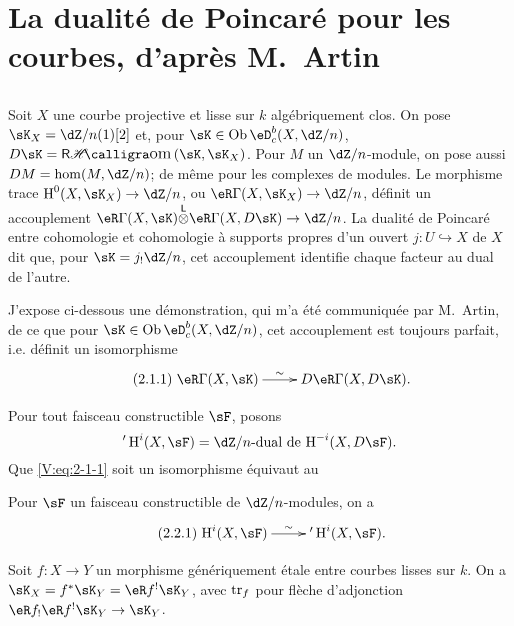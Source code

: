 \section{La dualité de Poincaré pour les courbes, d'après M.\ Artin}\label{V:2}





\subsection{}\label{V:2-1}

Soit $X$ une courbe projective et lisse sur $k$ algébriquement clos. On pose 
$\sK_X=\dZ/n(1)[2]$ et, pour $\sK\in\ob \eD_c^b(X,\dZ/n)$, 
$D\sK=\rHom(\sK,\sK_X)$. Pour $M$ un $\dZ/n$-module, on pose aussi 
$D M = \hom(M,\dZ/n)$; de même pour les complexes de modules. Le morphisme 
trace $\h^0(X,\sK_X) \to \dZ/n$, ou $\eR\Gamma(X,\sK_X)\to \dZ/n$, définit un 
accouplement $\eR\Gamma(X,\sK)\lotimes\eR\Gamma(X,D\sK) \to \dZ/n$. La dualité 
de Poincaré entre cohomologie et cohomologie à supports propres d'un ouvert 
$j:U\hookrightarrow X$ de $X$ dit que, pour $\sK=j_!\dZ/n$, cet accouplement 
identifie chaque facteur au dual de l'autre. 

J'expose ci-dessous une démonstration, qui m'a été communiquée par 
M.\ Artin, de ce que pour $\sK\in\ob\eD_c^b(X,\dZ/n)$, cet accouplement est 
toujours parfait, i.e. définit un isomorphisme
\begin{equation*}\tag{2.1.1}\label{V:eq:2-1-1}
\xymatrix{
  \eR\Gamma(X,\sK) \ar[r]^-\sim 
    & D \eR\Gamma(X,D\sK) \text{.}
}
\end{equation*}

Pour tout faisceau constructible $\sF$, posons 
\[
  '\h^i(X,\sF) = \text{$\dZ/n$-dual de $\h^{-i}(X,D\sF)$.}
\]
Que \eqref{V:eq:2-1-1} soit un isomorphisme équivaut au 





\begin{theorem_}\label{V:2-2}
Pour $\sF$ un faisceau constructible de $\dZ/n$-modules, on a 
\begin{equation*}\tag{2.2.1}\label{V:eq:2-2-1}
\xymatrix{
  \h^i(X,\sF) \ar[r]^-\sim 
    & '\h^i(X,\sF) \text{.}
}
\end{equation*}
\end{theorem_}





\begin{lemma_}\label{V:2-3}
Soit $f:X\to Y$ un morphisme génériquement étale entre courbes lisses sur 
$k$. On a $\sK_X=f^\ast\sK_Y=\eR f^!\sK_Y$, avec $\operatorname{tr}_f$ pour flèche 
d'adjonction $\eR f_!\eR f^!\sK_Y\to \sK_Y$.
\end{lemma_}

